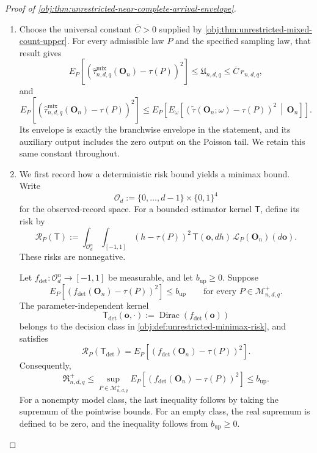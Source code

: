 \documentclass[11pt]{article}
\begin{document}
\begin{proof}[Proof of \cref{obj:thm:unrestricted-near-complete-arrival-envelope}]
\begin{enumerate}
\item Choose the universal constant \(\overline C>0\) supplied by
\cref{obj:thm:unrestricted-mixed-count-upper}. For every admissible law \(P\) and the specified sampling law, that result gives
\[
E_P\!\left[
\left(\widehat\tau^{\mathrm{mix}}_{n,d,q}(\mathbf O_n)-\tau(P)\right)^2
\right]
\le \mathfrak U_{n,d,q}
\le \overline C\,r_{n,d,q},
\]
and
\[
E_P\!\left[
\left(\widehat\tau^{\mathrm{mix}}_{n,d,q}(\mathbf O_n)-\tau(P)\right)^2
\right]
\le
E_P\!\left[
E_\omega\!\left[
\left(\widetilde\tau(\mathbf O_n;\omega)-\tau(P)\right)^2
\,\middle|\,\mathbf O_n
\right]\right].
\]
Its envelope is exactly the branchwise envelope in the statement, and its auxiliary output includes the zero output on the Poisson tail. We retain this same constant throughout.

\item We first record how a deterministic risk bound yields a minimax bound. Write
\[
\mathcal O_d:=\{0,\ldots,d-1\}\times\{0,1\}^{4}
\]
for the observed-record space. For a bounded estimator kernel \(\mathsf T\), define its risk by
\[
\mathcal R_P(\mathsf T)
:=
\int_{\mathcal O_d^n}\int_{[-1,1]}
(h-\tau(P))^2\,\mathsf T(\mathbf o,dh)\,
\mathcal L_P(\mathbf O_n)(d\mathbf o).
\]
These risks are nonnegative.

Let \(f_{\mathrm{det}}:\mathcal O_d^n\to[-1,1]\) be measurable, and let \(b_{\mathrm{up}}\ge0\). Suppose
\[
E_P\!\left[
\left(f_{\mathrm{det}}(\mathbf O_n)-\tau(P)\right)^2
\right]\le b_{\mathrm{up}}
\qquad
\text{for every }P\in\mathcal M^{+}_{n,d,q}.
\]
The parameter-independent kernel
\[
\mathsf T_{\mathrm{det}}(\mathbf o,\cdot)
:=\operatorname{Dirac}\!\left(f_{\mathrm{det}}(\mathbf o)\right)
\]
belongs to the decision class in \cref{obj:def:unrestricted-minimax-risk}, and satisfies
\[
\mathcal R_P(\mathsf T_{\mathrm{det}})
=
E_P\!\left[
\left(f_{\mathrm{det}}(\mathbf O_n)-\tau(P)\right)^2
\right].
\]
Consequently,
\[
\mathfrak R^{+}_{n,d,q}
\le
\sup_{P\in\mathcal M^{+}_{n,d,q}}
E_P\!\left[
\left(f_{\mathrm{det}}(\mathbf O_n)-\tau(P)\right)^2
\right]
\le b_{\mathrm{up}}.
\]
For a nonempty model class, the last inequality follows by taking the supremum of the pointwise bounds. For an empty class, the real supremum is defined to be zero, and the inequality follows from \(b_{\mathrm{up}}\ge0\).


\end{enumerate}
\end{proof}
\end{document}
